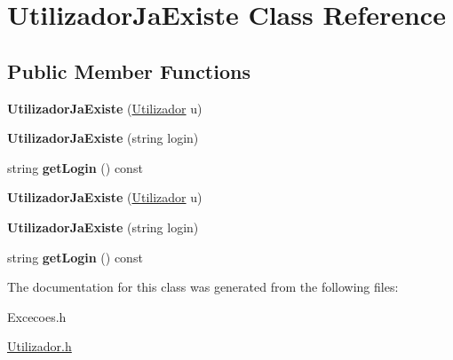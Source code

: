 \hypertarget{class_utilizador_ja_existe}{}\section{Utilizador\+Ja\+Existe Class Reference}
\label{class_utilizador_ja_existe}
\subsection*{Public Member Functions}
\begin{DoxyCompactItemize}
\item 
\hypertarget{class_utilizador_ja_existe_a8925b643209badc61a357c77d35a4a13}{}{\bfseries Utilizador\+Ja\+Existe} (\hyperlink{class_utilizador}{Utilizador} u)\label{class_utilizador_ja_existe_a8925b643209badc61a357c77d35a4a13}

\item 
\hypertarget{class_utilizador_ja_existe_ac8201f6b46706fa5827bebae23bb1169}{}{\bfseries Utilizador\+Ja\+Existe} (string login)\label{class_utilizador_ja_existe_ac8201f6b46706fa5827bebae23bb1169}

\item 
\hypertarget{class_utilizador_ja_existe_a545e95145227b85f40f6342ccbdfcab1}{}string {\bfseries get\+Login} () const \label{class_utilizador_ja_existe_a545e95145227b85f40f6342ccbdfcab1}

\item 
\hypertarget{class_utilizador_ja_existe_a8925b643209badc61a357c77d35a4a13}{}{\bfseries Utilizador\+Ja\+Existe} (\hyperlink{class_utilizador}{Utilizador} u)\label{class_utilizador_ja_existe_a8925b643209badc61a357c77d35a4a13}

\item 
\hypertarget{class_utilizador_ja_existe_ac8201f6b46706fa5827bebae23bb1169}{}{\bfseries Utilizador\+Ja\+Existe} (string login)\label{class_utilizador_ja_existe_ac8201f6b46706fa5827bebae23bb1169}

\item 
\hypertarget{class_utilizador_ja_existe_a545e95145227b85f40f6342ccbdfcab1}{}string {\bfseries get\+Login} () const \label{class_utilizador_ja_existe_a545e95145227b85f40f6342ccbdfcab1}

\end{DoxyCompactItemize}


The documentation for this class was generated from the following files\+:\begin{DoxyCompactItemize}
\item 
Excecoes.\+h\item 
\hyperlink{_utilizador_8h}{Utilizador.\+h}\end{DoxyCompactItemize}
